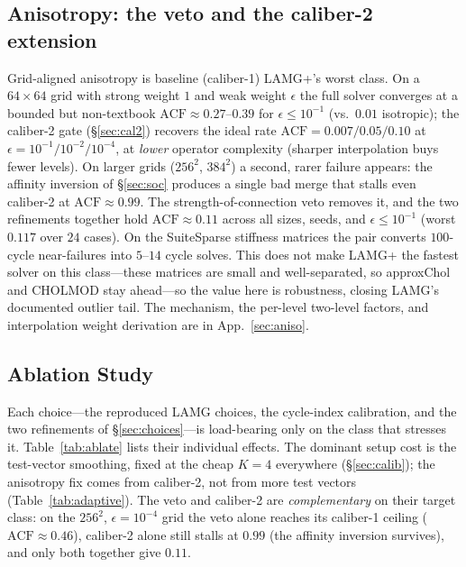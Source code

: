 \documentclass[leqno,letterpaper]{etna}
\newcommand{\acf}{\mathrm{ACF}}
\begin{document}
\subsection{Anisotropy: the veto and the caliber-2 extension}\label{sec:aniso-results}
Grid-aligned anisotropy is baseline (caliber-1) LAMG+'s worst class. On a $64\times64$ grid with
strong weight $1$ and weak weight $\epsilon$ the full solver converges at a bounded but
non-textbook $\acf\approx0.27$--$0.39$ for $\epsilon\le10^{-1}$ (vs.\ $0.01$ isotropic); the
caliber-2 gate (\S\ref{sec:cal2}) recovers the ideal rate $\acf=0.007/0.05/0.10$ at
$\epsilon=10^{-1}/10^{-2}/10^{-4}$, at \emph{lower} operator complexity (sharper interpolation
buys fewer levels). On larger grids ($256^2$, $384^2$) a second, rarer failure appears:
the affinity inversion of \S\ref{sec:soc} produces a single bad merge that stalls even caliber-2
at $\acf\approx0.99$. The strength-of-connection veto removes it, and the two refinements together
hold $\acf\approx0.11$ across all sizes, seeds, and $\epsilon\le10^{-1}$ (worst $0.117$ over $24$
cases). On the SuiteSparse stiffness matrices the pair converts $100$-cycle near-failures into
$5$--$14$ cycle solves. This does not make LAMG+ the fastest solver on this class---these
matrices are small and well-separated, so approxChol and CHOLMOD stay ahead---so the
value here is robustness, closing LAMG's documented outlier tail. The
mechanism, the per-level two-level factors, and interpolation weight derivation are in App.~\ref{sec:aniso}.

\subsection{Ablation Study}\label{sec:ablation}
Each choice---the reproduced LAMG choices, the cycle-index calibration, and the two refinements
of \S\ref{sec:choices}---is load-bearing only on the class that stresses it. Table~\ref{tab:ablate}
lists their individual effects. The dominant setup cost is the test-vector smoothing, fixed at the cheap
$K{=}4$ everywhere (\S\ref{sec:calib}); the anisotropy fix comes from caliber-2, not from more test
vectors (Table~\ref{tab:adaptive}). The veto and
caliber-2 are \emph{complementary} on their target class: on the $256^2$, $\epsilon=10^{-4}$ grid
the veto alone reaches its caliber-1 ceiling ($\acf\approx0.46$), caliber-2 alone still stalls at
$0.99$ (the affinity inversion survives), and only both together give $0.11$.
\end{document}
